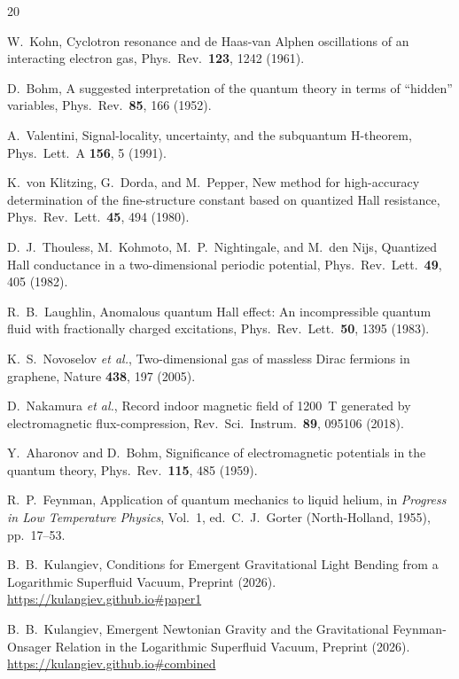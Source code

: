 \documentclass[12pt, a4paper]{article}
\begin{document}
\begin{thebibliography}{20}

W.~Kohn,
Cyclotron resonance and de Haas-van Alphen
oscillations of an interacting electron gas,
Phys.\ Rev.\ \textbf{123}, 1242 (1961).

D.~Bohm,
A suggested interpretation of the quantum theory in
terms of ``hidden'' variables,
Phys.\ Rev.\ \textbf{85}, 166 (1952).

A.~Valentini,
Signal-locality, uncertainty, and the subquantum
H-theorem,
Phys.\ Lett.\ A \textbf{156}, 5 (1991).

K.~von Klitzing, G.~Dorda, and M.~Pepper,
New method for high-accuracy determination of the
fine-structure constant based on quantized Hall
resistance,
Phys.\ Rev.\ Lett.\ \textbf{45}, 494 (1980).

D.~J.~Thouless, M.~Kohmoto, M.~P.~Nightingale,
and M.~den Nijs,
Quantized Hall conductance in a two-dimensional
periodic potential,
Phys.\ Rev.\ Lett.\ \textbf{49}, 405 (1982).

R.~B.~Laughlin,
Anomalous quantum Hall effect: An incompressible
quantum fluid with fractionally charged excitations,
Phys.\ Rev.\ Lett.\ \textbf{50}, 1395 (1983).

K.~S.~Novoselov \emph{et al.},
Two-dimensional gas of massless Dirac fermions in
graphene,
Nature \textbf{438}, 197 (2005).

D.~Nakamura \emph{et al.},
Record indoor magnetic field of 1200~T generated by
electromagnetic flux-compression,
Rev.\ Sci.\ Instrum.\ \textbf{89}, 095106 (2018).

Y.~Aharonov and D.~Bohm,
Significance of electromagnetic potentials in the
quantum theory,
Phys.\ Rev.\ \textbf{115}, 485 (1959).

R.~P.~Feynman,
Application of quantum mechanics to liquid helium,
in \emph{Progress in Low Temperature Physics},
Vol.~1, ed.\ C.~J.~Gorter (North-Holland, 1955),
pp.~17--53.

B.~B.~Kulangiev,
Conditions for Emergent Gravitational Light Bending from a Logarithmic Superfluid Vacuum,
Preprint (2026).
\url{https://kulangiev.github.io#paper1}

B.~B.~Kulangiev,
Emergent Newtonian Gravity and the Gravitational Feynman-Onsager Relation in the Logarithmic Superfluid Vacuum,
Preprint (2026).
\url{https://kulangiev.github.io#combined}


\end{thebibliography}
\end{document}
